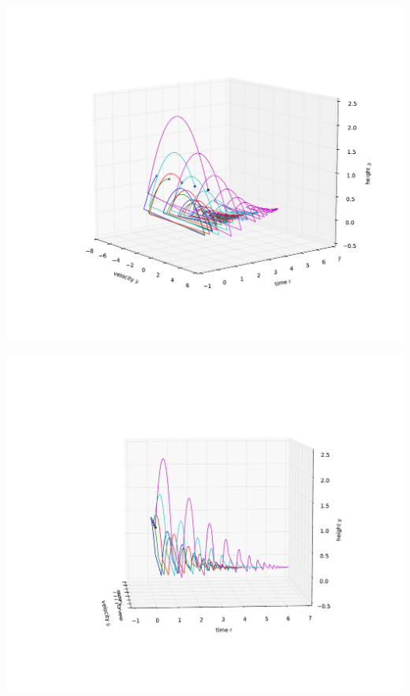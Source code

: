 \documentclass[12pt]{beamer}
\begin{document}
\begin{frame}
\vfill\centering
\includegraphics[width=.9\linewidth]{bouncing_ball_deflattened}
\vfill\null
\end{frame}
\begin{frame}
\vfill\centering
\includegraphics[width=.9\linewidth]{bouncing_ball_deflattened2}
\vfill\null
\end{frame}
\end{document}
